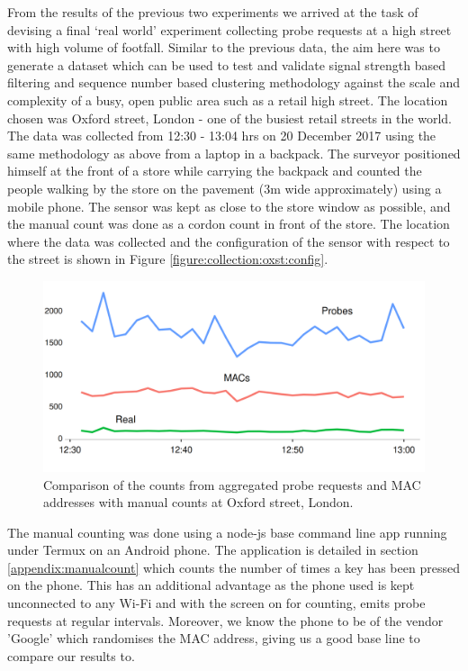 From the results of the previous two experiments we arrived at the task of devising a final `real world' experiment collecting probe requests at a high street with high volume of footfall.
Similar to the previous data, the aim here was to generate a dataset which can be used to test and validate signal strength based filtering and sequence number based clustering methodology against the scale and complexity of a busy, open public area such as a retail high street.
The location chosen was Oxford street, London - one of the busiest retail streets in the world.
The data was collected from 12:30 - 13:04 hrs on 20 December 2017 using the same methodology as above from a laptop in a backpack.
The surveyor positioned himself at the front of a store while carrying the backpack and counted the people walking by the store on the pavement (3m wide approximately) using a mobile phone.
The sensor was kept as close to the store window as possible, and the manual count was done as a cordon count in front of the store.
The location where the data was collected and the configuration of the sensor with respect to the street is shown in Figure \ref{figure:collection:oxst:config}.

\begin{figure}
  \includegraphics[trim={0 0 0 0},clip]{images/oxst-counts.png}
  \caption{Comparison of the counts from aggregated probe requests and MAC addresses with manual counts at Oxford street, London.}
  \label{figure:collection:oxst:initial}
\end{figure}

The manual counting was done using a node-js base command line app running under Termux on an Android phone.
The application is detailed in section \ref{appendix:manualcount} which counts the number of times a key has been pressed on the phone.
This has an additional advantage as the phone used is kept unconnected to any Wi-Fi and with the screen on for counting, emits probe requests at regular intervals.
Moreover, we know the phone to be of the vendor 'Google' which randomises the MAC address, giving us a good base line to compare our results to.

